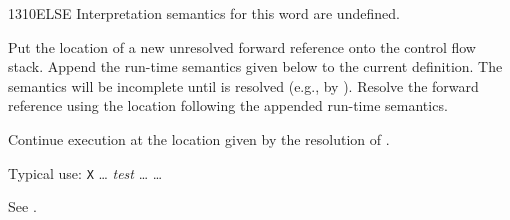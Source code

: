 \begin{worddef}{1310}{ELSE}
\vspace*{-2ex}
\interpret
	Interpretation semantics for this word are undefined.

\compile

	Put the location of a new unresolved forward reference
	 onto the control flow stack. Append the run-time
	semantics given below to the current definition. The semantics
	will be incomplete until  is resolved (e.g., by
	). Resolve the forward reference  using
	the location following the appended run-time semantics.

\runtime
	\stack{}{}

	Continue execution at the location given by the resolution of
	.


	\begin{rationale} %
		Typical use:
			\word{:} \texttt{X} {\ldots}
				\emph{test}  {\ldots}
				 {\ldots} 
			\word{;}
	\end{rationale}

	\begin{testing} %
		See .
	\end{testing}
\end{worddef}



